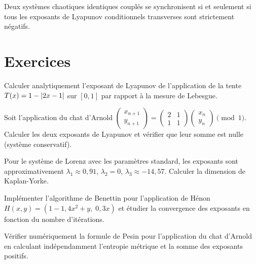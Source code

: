 \begin{theoreme}
Deux syst\`emes chaotiques identiques coupl\'es se synchronisent si et
seulement si tous les exposants de Lyapunov conditionnels transverses sont
strictement n\'egatifs.
\end{theoreme}

\section{Exercices}

\begin{exercice}
Calculer analytiquement l'exposant de Lyapunov de l'application de la tente
$T(x) = 1 - \left| 2x - 1 \right|$ sur $[0,1]$ par rapport \`a la mesure de Lebesgue.
\end{exercice}

\begin{exercice}
Soit l'application du chat d'Arnold $\begin{pmatrix} x_{n+1} \\ y_{n+1} \end{pmatrix}
= \begin{pmatrix} 2 & 1 \\ 1 & 1 \end{pmatrix} \begin{pmatrix} x_n \\ y_n \end{pmatrix}
\pmod{1}$. Calculer les deux exposants de Lyapunov et v\'erifier que leur somme
est nulle (syst\`eme conservatif).
\end{exercice}

\begin{exercice}
Pour le syst\`eme de Lorenz avec les param\`etres standard, les exposants
sont approximativement $\lambda_1 \approx 0{,}91$, $\lambda_2 = 0$,
$\lambda_3 \approx -14{,}57$. Calculer la dimension de Kaplan-Yorke.
\end{exercice}

\begin{exercice}
Impl\'ementer l'algorithme de Benettin pour l'application de H\'enon
$H(x,y) = (1 - 1{,}4x^2 + y, \; 0{,}3x)$ et \'etudier la convergence
des exposants en fonction du nombre d'it\'erations.
\end{exercice}

\begin{exercice}
V\'erifier num\'eriquement la formule de Pesin pour l'application du chat
d'Arnold en calculant ind\'ependamment l'entropie m\'etrique et la somme des
exposants positifs.
\end{exercice}
